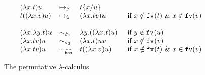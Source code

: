 \documentclass{LMCS}
\renewcommand{\>}{\rightarrow}
\def\lam{\lambda}
\newcommand{\rRew}[1]{\mapsto_{#1}}
\newcommand{\isubs}[1]{ \{ #1  \} }
\newcommand{\fv}[1]{{\tt fv}(#1)}
\newcommand{\unboxed}{{\tt u}}
\newcommand{\preeqw}[1]{\sim_{#1}}
\def\rsig{\hat{\sigma}}
\newcommand{\runboxed}{\hat{\unboxed}}
\newcommand{\boite}{{\tt box}}
\newcommand{\rsigt}{\widehat{\boite}}
\begin{document}
\begin{figure}
\[\begin{array}{lll@{\hspace{.5cm}}l}
(\lam x.t) u & \rRew{\beta}&  t\isubs{x/u}    \\
t ((\lam x. v) u)     & \rRew{\runboxed} & (\lam x.t v) u   & \mbox{if } x \notin \fv{t}\ \&\ x\notin \fv{v}\\\\

(\lam x. \lam y.t) u & \preeqw{\rsig_1} & \lam y. ((\lam x.t) u) & \mbox{if } y\notin\fv{u}\\
(\lam x.t v) u     & \preeqw{\rsig_2} & (\lam x. t) u v    & \mbox{if } x\notin \fv{v}\\
(\lam x.t v) u     & \preeqw{\rsigt} & t ((\lam x. v) u)    & \mbox{if } x \notin \fv{t}\ \&\ x\in \fv{v}\\

\end{array}\]
\caption{\label{fig:perm-lambda} The permutative $\lam$-calculus}
\end{figure}
\end{document}
